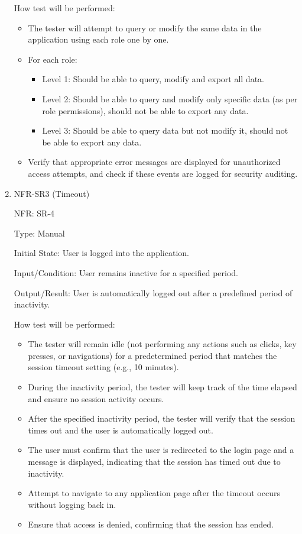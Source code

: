 \documentclass[12pt, titlepage]{article}
\begin{document}
\begin{enumerate}
  How test will be performed: 
  \begin{itemize}
    \item The tester will attempt to query or modify the same data in the
    application using each role one by one.
    \item For each role:
    \begin{itemize}
      \item Level 1: Should be able to query, modify and export all data.
      \item Level 2: Should be able to query and modify only specific data (as
      per role permissions), should not be able to export any data.
      \item Level 3: Should be able to query data but not modify it, should not
      be able to export any data.
    \end{itemize}
    \item Verify that appropriate error messages are displayed for unauthorized
    access attempts, and check if these events are logged for security auditing.
  \end{itemize}

\item{NFR-SR3 (Timeout)\\}
  
  NFR: SR-4
  
  Type: Manual
  
  Initial State: User is logged into the application.
  
  Input/Condition: User remains inactive for a specified period.
  
  Output/Result: User is automatically logged out after a predefined period of
  inactivity.

  How test will be performed: 
  \begin{itemize}
    \item The tester will remain idle (not performing any actions such as
    clicks, key presses, or navigations) for a predetermined period that matches
    the session timeout setting (e.g., 10 minutes).
    \item During the inactivity period, the tester will keep track of the time
    elapsed and ensure no session activity occurs.
    \item After the specified inactivity period, the tester will verify that the
    session times out and the user is automatically logged out.
    \item The user must confirm that the user is redirected to the login page
    and a message is displayed, indicating that the session has timed out due to
    inactivity.
    \item Attempt to navigate to any application page after the timeout occurs
    without logging back in.
    \item Ensure that access is denied, confirming that the session has ended.
  \end{itemize}


\end{enumerate}
\end{document}
